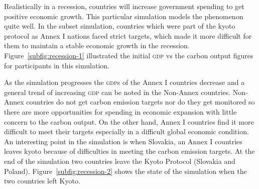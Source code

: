 Realistically in a recession, countries will increase government spending to get positive economic growth. This particular simulation models the phenomenon quite well. In the subset simulation, countries which were part of the kyoto protocol as Annex I nations faced strict targets, which made it more difficult for them to maintain a stable economic growth in the recession. Figure~\ref{subfig:recession-1} illustrated the initial \textsc{gdp} vs the carbon output figures for participants in this simulation.

As the simulation progresses the \textsc{gdp}s of the Annex I countries decrease and a general trend of increasing \textsc{gdp} can be noted in the Non-Annex countries. Non-Annex countries do not get carbon emission targets nor do they get monitored so there are more opportunities for spending in economic expansion with little concern to the carbon output. On the other hand, Annex I countries find it more difficult to meet their targets especially in a difficult global economic condition. An interesting point in the simulation is when Slovakia, an Annex I countries leaves kyoto because of difficulties in meeting the carbon emission targets. At the end of the simulation two countries leave the Kyoto Protocol (Slovakia and Poland). Figure~\ref{subfig:recession-2} shows the state of the simulation when the two countries left Kyoto.

